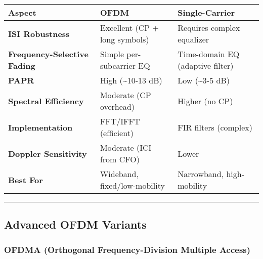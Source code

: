 {\def\LTcaptype{} %
\begin{longtable}[]{@{}
  >{\raggedright\arraybackslash}p{}
  >{\raggedright\arraybackslash}p{}
  >{\raggedright\arraybackslash}p{}@{}}
\toprule\noalign{}
\begin{minipage}[b]{\linewidth}\raggedright
Aspect
\end{minipage} & \begin{minipage}[b]{\linewidth}\raggedright
OFDM
\end{minipage} & \begin{minipage}[b]{\linewidth}\raggedright
Single-Carrier
\end{minipage} \\
\midrule\noalign{}
\endhead
\bottomrule\noalign{}
\endlastfoot
\textbf{ISI Robustness} & Excellent (CP + long symbols) & Requires
complex equalizer \\
\textbf{Frequency-Selective Fading} & Simple per-subcarrier EQ &
Time-domain EQ (adaptive filter) \\
\textbf{PAPR} & High (\textasciitilde10-13 dB) & Low (\textasciitilde3-5
dB) \\
\textbf{Spectral Efficiency} & Moderate (CP overhead) & Higher (no
CP) \\
\textbf{Implementation} & FFT/IFFT (efficient) & FIR filters
(complex) \\
\textbf{Doppler Sensitivity} & Moderate (ICI from CFO) & Lower \\
\textbf{Best For} & Wideband, fixed/low-mobility & Narrowband,
high-mobility \\
\end{longtable}
}

\begin{center}\rule{0.5\linewidth}{0.5pt}\end{center}

\subsection{\texorpdfstring{ Advanced OFDM
Variants}{ Advanced OFDM Variants}}\label{advanced-ofdm-variants}

\subsubsection{OFDMA (Orthogonal Frequency-Division Multiple
Access)}\label{ofdma-orthogonal-frequency-division-multiple-access}

